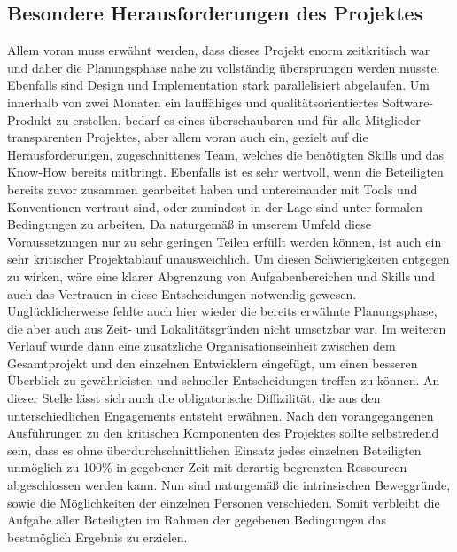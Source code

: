 \documentclass[12pt,a4paper]{article}
\begin{document}
\subsection{Besondere Herausforderungen des Projektes}
Allem voran muss erwähnt werden, dass dieses Projekt enorm zeitkritisch war und daher die Planungsphase nahe zu vollständig übersprungen werden musste. Ebenfalls sind Design und Implementation stark parallelisiert abgelaufen. Um innerhalb von zwei Monaten ein lauffähiges und qualitätsorientiertes Software-Produkt zu erstellen, bedarf es eines überschaubaren und für alle Mitglieder transparenten Projektes, aber allem voran auch ein, gezielt auf die Herausforderungen, zugeschnittenes Team, welches die benötigten Skills und das Know-How bereits mitbringt. Ebenfalls ist es sehr wertvoll, wenn die Beteiligten bereits zuvor zusammen gearbeitet haben und untereinander mit Tools und Konventionen vertraut sind, oder zumindest in der Lage sind unter formalen Bedingungen zu arbeiten. Da naturgemäß in unserem Umfeld diese Voraussetzungen nur zu sehr geringen Teilen erfüllt werden können, ist auch ein sehr kritischer Projektablauf unausweichlich. Um diesen Schwierigkeiten entgegen zu wirken, wäre eine klarer Abgrenzung von Aufgabenbereichen
und Skills und auch das Vertrauen in diese Entscheidungen notwendig gewesen. Unglücklicherweise fehlte auch hier wieder die bereits erwähnte Planungsphase, die aber auch aus Zeit- und Lokalitätsgründen nicht umsetzbar war. Im weiteren Verlauf wurde dann eine zusätzliche Organisationseinheit zwischen dem Gesamtprojekt und den einzelnen Entwicklern eingefügt, um einen besseren Überblick zu gewährleisten und schneller Entscheidungen treffen zu können. An dieser Stelle lässt sich auch die obligatorische Diffizilität, die aus den unterschiedlichen Engagements entsteht erwähnen. Nach den vorangegangenen Ausführungen zu den kritischen Komponenten des Projektes sollte selbstredend sein, dass es ohne überdurchschnittlichen Einsatz jedes einzelnen Beteiligten
unmöglich zu 100\% in gegebener Zeit mit derartig begrenzten Ressourcen abgeschlossen werden kann. Nun sind naturgemäß die intrinsischen Beweggründe, sowie die Möglichkeiten der einzelnen Personen verschieden. Somit verbleibt die Aufgabe aller Beteiligten im Rahmen der gegebenen
Bedingungen das bestmöglich Ergebnis zu erzielen.
\newpage
\end{document}
